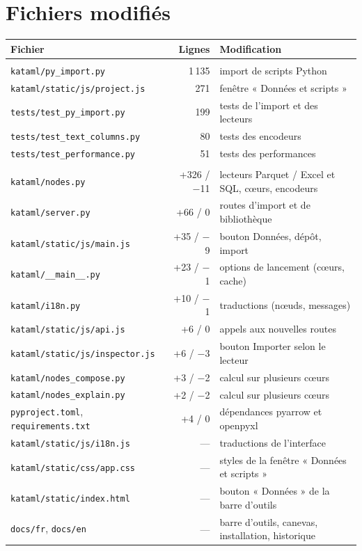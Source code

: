 \documentclass[11pt,a4paper]{article}
\newcommand{\code}[1]{\texttt{#1}}
\begin{document}
\clearpage
\section{Fichiers modifiés}

\begin{center}
\small
\begin{tabularx}{\linewidth}{>{\raggedright\arraybackslash}p{6.4cm}rX}
  \toprule
  \textbf{Fichier} & \textbf{Lignes} & \textbf{Modification} \\
  \midrule
  \multicolumn{3}{l}{\emph{Nouveaux fichiers}} \\
  \code{kataml/py\_import.py} & 1\,135 & import de scripts Python \\
  \code{kataml/static/js/project.js} & 271 & fenêtre « Données et scripts » \\
  \code{tests/test\_py\_import.py} & 199 & tests de l'import et des lecteurs \\
  \code{tests/test\_text\_columns.py} & 80 & tests des encodeurs \\
  \code{tests/test\_performance.py} & 51 & tests des performances \\
  \midrule
  \multicolumn{3}{l}{\emph{Fichiers existants} (lignes ajoutées / retirées)} \\
  \code{kataml/nodes.py} & +326 / $-$11 & lecteurs Parquet / Excel et SQL, cœurs, encodeurs \\
  \code{kataml/server.py} & +66 / 0 & routes d'import et de bibliothèque \\
  \code{kataml/static/js/main.js} & +35 / $-$9 & bouton Données, dépôt, import \\
  \code{kataml/\_\_main\_\_.py} & +23 / $-$1 & options de lancement (cœurs, cache) \\
  \code{kataml/i18n.py} & +10 / $-$1 & traductions (nœuds, messages) \\
  \code{kataml/static/js/api.js} & +6 / 0 & appels aux nouvelles routes \\
  \code{kataml/static/js/inspector.js} & +6 / $-$3 & bouton Importer selon le lecteur \\
  \code{kataml/nodes\_compose.py} & +3 / $-$2 & calcul sur plusieurs cœurs \\
  \code{kataml/nodes\_explain.py} & +2 / $-$2 & calcul sur plusieurs cœurs \\
  \code{pyproject.toml}, \code{requirements.txt} & +4 / 0 & dépendances pyarrow et openpyxl \\
  \code{kataml/static/js/i18n.js} & --- & traductions de l'interface \\
  \code{kataml/static/css/app.css} & --- & styles de la fenêtre « Données et scripts » \\
  \code{kataml/static/index.html} & --- & bouton « Données » de la barre d'outils \\
  \code{docs/fr}, \code{docs/en} & --- & barre d'outils, canevas, installation, historique \\
  \bottomrule
\end{tabularx}
\end{center}
\end{document}
